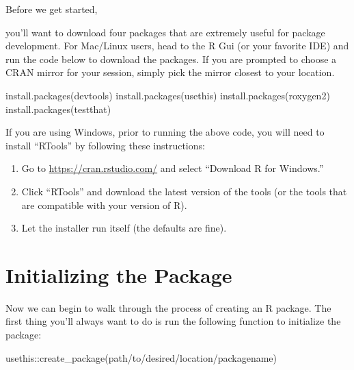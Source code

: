 \documentclass[
]{book}
\newenvironment{Shaded}{\begin{snugshade}}{\end{snugshade}}
\newcommand{\FunctionTok}[1]{\textcolor[rgb]{0.00,0.00,0.00}{#1}}
\newcommand{\NormalTok}[1]{#1}
\newcommand{\SpecialCharTok}[1]{\textcolor[rgb]{0.00,0.00,0.00}{#1}}
\newcommand{\StringTok}[1]{\textcolor[rgb]{0.31,0.60,0.02}{#1}}
\begin{document}
Before we get started,

you'll want to download four packages that are extremely useful for package development. For Mac/Linux users, head to the R Gui (or your favorite IDE) and run the code below to download the packages. If you are prompted to choose a CRAN mirror for your session, simply pick the mirror closest to your location.

\begin{Shaded}
\begin{Highlighting}[]
\FunctionTok{install.packages}\NormalTok{(}\StringTok{\textquotesingle{}devtools\textquotesingle{}}\NormalTok{)}
\FunctionTok{install.packages}\NormalTok{(}\StringTok{\textquotesingle{}usethis\textquotesingle{}}\NormalTok{)}
\FunctionTok{install.packages}\NormalTok{(}\StringTok{\textquotesingle{}roxygen2\textquotesingle{}}\NormalTok{)}
\FunctionTok{install.packages}\NormalTok{(}\StringTok{\textquotesingle{}testthat\textquotesingle{}}\NormalTok{)}
\end{Highlighting}
\end{Shaded}

If you are using Windows, prior to running the above code, you will need to install ``RTools'' by following these instructions:

\begin{enumerate}
\def\labelenumi{\arabic{enumi}.}
\item
  Go to \url{https://cran.rstudio.com/} and select ``Download R for Windows.''
\item
  Click ``RTools'' and download the latest version of the tools (or the tools that are compatible with your version of R).
\item
  Let the installer run itself (the defaults are fine).
\end{enumerate}

\hypertarget{initializing-the-package}{%
\section{Initializing the Package}\label{initializing-the-package}}

Now we can begin to walk through the process of creating an R package. The first thing you'll always want to do is run the following function to initialize the package:

\begin{Shaded}
\begin{Highlighting}[]
\NormalTok{usethis}\SpecialCharTok{::}\FunctionTok{create\_package}\NormalTok{(}\StringTok{\textquotesingle{}path/to/desired/location/packagename\textquotesingle{}}\NormalTok{)}
\end{Highlighting}
\end{Shaded}
\end{document}
